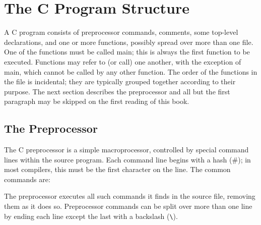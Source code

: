 \chapter{The C Program Structure}


A C  program consists  of {\kc preprocessor commands}, {\kc
comments}, some {\kc top-level declarations}, and  one or  more {\kc
functions},  possibly spread over more than one file. One  of the 
functions must  be called  {\cd main}; this  is always  the first
function to  be executed.  Functions may refer to (or call) one
another, with the exception of  {\cd main}, which cannot be called by
any other function. The order of the functions  in the  file is
incidental; they are typically grouped together according to their
purpose.  The next section describes the preprocessor and all but the
first paragraph may be skipped on the first reading of this book.

\section{The Preprocessor}

The C preprocessor is  a simple  macroprocessor, controlled  by
special  command  lines within the source program.  Each command line
begins with a hash ({\cd \#}); in most compilers, this must be the
first character on the line. The common commands are:
 
The preprocessor  executes all  such  commands  it  finds  in the 
source file, removing them as it does so. Preprocessor commands can
be split over more than one line by ending each line except the last
with a backslash (\verb+\+).



